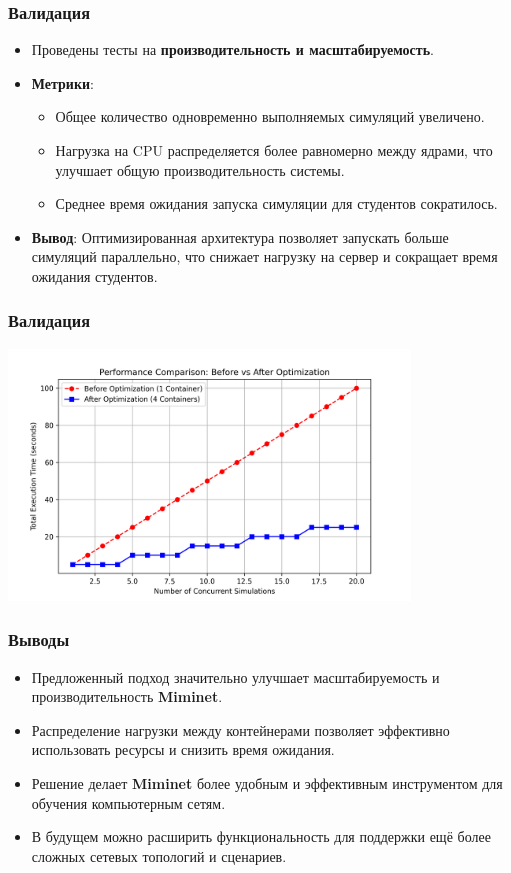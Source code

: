 \documentclass{beamer}
\begin{document}
\begin{frame}[fragile]
  \frametitle{Валидация}
  \begin{itemize}
    \item Проведены тесты на \textbf{производительность и масштабируемость}.
    \item \textbf{Метрики}:
      \begin{itemize}
        \item Общее количество одновременно выполняемых симуляций увеличено.
        \item Нагрузка на CPU распределяется более равномерно между ядрами, что улучшает общую производительность системы.
        \item Среднее время ожидания запуска симуляции для студентов сократилось.
      \end{itemize}
    \item \textbf{Вывод}: Оптимизированная архитектура позволяет запускать больше симуляций параллельно, что снижает нагрузку на сервер и сокращает время ожидания студентов.
  \end{itemize}

\end{frame}
\begin{frame}[fragile]
  \frametitle{Валидация}
  \begin{center}
    \includegraphics[width=0.8\textwidth]{performance_comparison.png} %
  \end{center}
\end{frame}

\begin{frame}[fragile]
  \frametitle{Выводы}
  \begin{itemize}
    \item Предложенный подход значительно улучшает масштабируемость и производительность \textbf{Miminet}.
    \item Распределение нагрузки между контейнерами позволяет эффективно использовать ресурсы и снизить время ожидания.
    \item Решение делает \textbf{Miminet} более удобным и эффективным инструментом для обучения компьютерным сетям.
    \item В будущем можно расширить функциональность для поддержки ещё более сложных сетевых топологий и сценариев.
  \end{itemize}
\end{frame}
\end{document}
